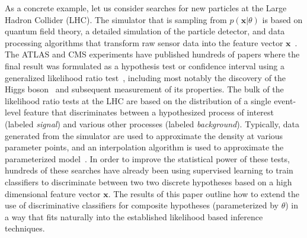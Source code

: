 \documentclass[12pt]{article}
\numberwithin{equation}{section}
\theoremstyle{plain}
\begin{document}
As a concrete example, let us consider searches for new particles at the Large
Hadron Collider (LHC). The simulator that is sampling from $p(\mathbf{x}|\theta)$ is
based on quantum field theory, a detailed simulation of the particle detector,
and data processing algorithms that transform raw sensor data into the feature
vector $\mathbf{x}$~\citep{Sjostrand:2006za,Agostinelli:2002hh}. The ATLAS and CMS
experiments have published  hundreds of papers where the final result was
formulated as a hypothesis test or confidence interval using a generalized
likelihood ratio test~\citep{Cowan:2010js}, including most notably the discovery
of the Higgs boson~\citep{Aad:2012tfa,Chatrchyan:2012ufa} and subsequent
measurement of its properties. The bulk of the likelihood ratio tests at the LHC
are based on the distribution of a single event-level feature that discriminates
between a hypothesized process of interest (labeled \textit{signal}) and various
other processes (labeled \textit{background}).
Typically, data generated from the
simulator are used to approximate the density at various parameter points, and
an interpolation algorithm is used to approximate the parameterized
model~\citep{Cranmer:2012sba}. In order to improve the statistical power
of these tests, hundreds of these searches have already been using supervised
learning to train classifiers to discriminate between two two discrete hypotheses based
on a high dimensional feature vector $\mathbf{x}$. The results of this paper outline
how to extend the use of discriminative classifiers for composite hypotheses (parameterized by $\theta$)
in a way
that fits naturally into the established likelihood based inference techniques.
\end{document}
